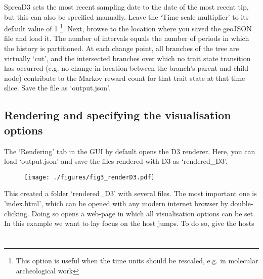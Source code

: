 \documentclass[english]{paper}
\begin{document}
SpreaD3 sets the most recent sampling date to the date of the most recent tip, but this can also be specified manually.
Leave the `Time scale multiplier' to its default value of 1 \footnote{This option is useful when the time units should be rescaled,  e.g. in molecular archeological work}. 
Next, browse to the location where you saved the geoJSON file and load it.
The number of intervals equals the number of periods in which the history is partitioned. %
At each change point, all branches of the tree are virtually `cut', and the intersected branches over which no trait state transition has occurred (e.g. no change in location between the branch's parent and child node) contribute to the Markov reward count for that trait state at that time slice.
Save the file as `output.json'.

\subsection{Rendering and specifying the visualisation options}

The `Rendering' tab in the GUI by default opens the D3 renderer.
Here, you can load `output.json' and save the files rendered with D3 as `rendered\_D3'. %

\begin{figure}[!H]
\centering
\texttt{[image: ./figures/fig3\_renderD3.pdf]} %
\label{fig:loadData}
\end{figure}

This created a folder `rendered\_D3' with several files.
The most important one is 'index.html', which can be opened with any modern internet browser by double-clicking. 
Doing so opens a web-page in which all visualisation options can be set.
In this example we want to lay focus on the host jumps.
To do so, give the hosts


\section{}
\end{document}
